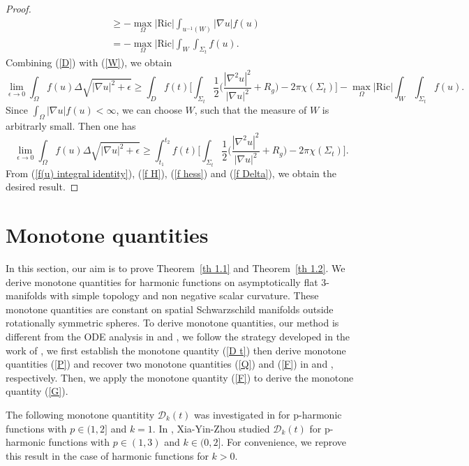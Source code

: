 \documentclass[12pt]{article}
\theoremstyle{definition}
\theoremstyle{plain}
\numberwithin{equation}{section}
\begin{document}
\begin{proof}
\begin{equation}
\begin{aligned}
&\geq -\max_{\Omega}|\mathrm{Ric}|\int_{u^{-1}(W)}|\nabla u|f(u)\\
&=-\max_{\Omega}|\mathrm{Ric}|\int_{W}\int_{\Sigma_{t}}f(u).
\end{aligned}
\end{equation}
Combining (\ref{D}) with (\ref{W}), we obtain 
$$
\lim\limits_{\epsilon\to 0}\int_{\Omega}f(u)\Delta \sqrt{|\nabla u|^{2}+\epsilon}\geq \int_{D}f(t)\Big[\int_{\Sigma_{t}}\frac{1}{2}\Big(\frac{|\nabla^{2}u|^{2}}{|\nabla u|^{2}}+R_{g}\Big)-2\pi \chi(\Sigma_{t}) \Big]-\max_{\Omega}|\mathrm{Ric}|\int_{W}\int_{\Sigma_{t}}f(u).
$$
Since $ \int_{\Omega}|\nabla u|f(u)<\infty $, we can choose $ W $, such that the measure of $ W $ is arbitrarly small. Then one has
\begin{equation}\label{f Delta}
\lim\limits_{\epsilon\to 0}\int_{\Omega}f(u)\Delta \sqrt{|\nabla u|^{2}+\epsilon}\geq \int_{t_{1}}^{t_{2}}f(t)\Big[\int_{\Sigma_{t}}\frac{1}{2}\Big(\frac{|\nabla^{2}u|^{2}}{|\nabla u|^{2}}+R_{g}\Big)-2\pi \chi(\Sigma_{t}) \Big].
\end{equation}
From (\ref{f(u) integral identity}), (\ref{f H}), (\ref{f hess}) and (\ref{f Delta}), we obtain the desired result. 
\end{proof}

\section{\bf Monotone quantities}
In this section, our aim is to prove Theorem~\ref{th 1.1} and Theorem~\ref{th 1.2}. We derive monotone quantities for harmonic functions on asymptotically flat 3-manifolds with simple topology and non
negative scalar curvature. These monotone quantities are constant
on spatial Schwarzschild manifolds outside rotationally symmetric spheres. To derive monotone quantities, our method is different from the ODE analysis in \cite{Xia} and \cite{Maz}, we follow the strategy developed in the work of \cite{Miao}, we first establish the monotone quantity (\ref{D t}) then derive monotone quantities (\ref{P}) and recover two monotone quantities (\ref{Q}) and (\ref{F}) in \cite{Miao 0} and \cite{Xia}, respectively. Then, we apply the monotone quantity (\ref{F}) to derive the monotone quantity (\ref{G}). 

The following monotone quantitity $ \mathcal{D}_{k}(t) $ was investigated in \cite{Miao, Hrisch1} for p-harmonic functions with $ p\in (1,2] $ and $ k=1 $. In \cite{Xia}, Xia-Yin-Zhou studied $ \mathcal{D}_{k}(t) $ for p-harmonic functions with $ p\in (1,3) $ and $ k\in (0,2] $. For convenience, we reprove this result in the case of harmonic functions for $ k>0 $.
\end{document}
